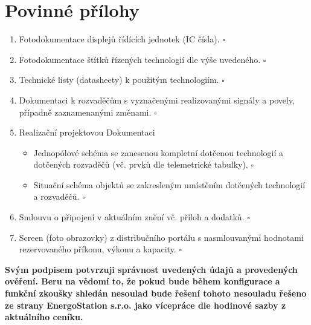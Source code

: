 \section{Povinné přílohy}
    \begin{enumerate}[label=\alph*)]
        \item Fotodokumentace displejů řídících jednotek (IC čísla). \hfill $\square$
        \item Fotodokumentace štítků řízených technologií dle výše uvedeného. \hfill $\square$
        \item Technické listy (datasheety) k použitým technologiím. \hfill $\square$
        
        
        \item Dokumentaci k rozvaděčům s vyznačenými realizovanými \newline signály a povely, případně zaznamenanými změnami. \hfill $\square$
        \item Realizační projektovou Dokumentaci
        \begin{itemize}
            \item Jednopólové schéma se zanesenou kompletní dotčenou technologií \newline a dotčených rozvaděčů (vč. prvků dle telemetrické tabulky). \hfill $\square$
            \item Situační schéma objektů se zakresleným umístěním dotčených \newline technologií a rozvaděčů. \hfill $\square$
        \end{itemize}
        \item Smlouvu o připojení v aktuálním znění vč. příloh a dodatků. \hfill $\square$
        \item Screen (foto obrazovky) z distribučního portálu s nasmlouvanými \newline hodnotami rezervovaného příkonu, výkonu a kapacity. \hfill $\square$
    \end{enumerate}
    \label{podkladyProChecklist}

    \textbf{Svým podpisem potvrzuji správnost uvedených údajů a provedených ověření. Beru na vědomí to, že pokud bude během konfigurace a funkční zkoušky shledán nesoulad bude řešení tohoto nesouladu řešeno ze strany EnergoStation s.r.o. jako vícepráce dle hodinové sazby z aktuálního ceníku.}

